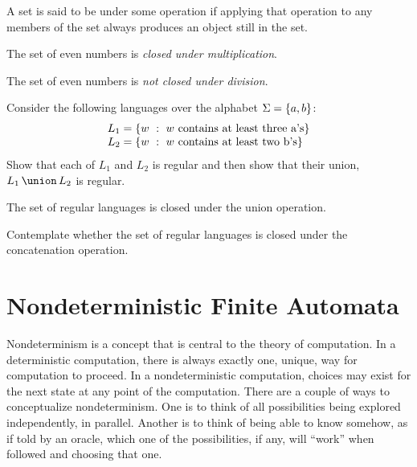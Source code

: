 \documentclass[twoside,letterpaper,openany]{book}
\begin{document}
\begin{defn}[Closure]
A set is said to be  under some operation if applying that operation to any members of the set always produces an object still in the set.
\end{defn}

\begin{thm}
The set of even numbers is \emph{closed under multiplication}.
\end{thm}

\begin{thm}
The set of even numbers is \emph{not closed under division}.
\end{thm}

\begin{exer}
Consider the following languages over the alphabet $\Sigma = \left\lbrace a, b \right\rbrace$:
\[\begin{array}{l}
L_1 = \left\lbrace w\ :\ w~\textrm{contains at least three a's} \right\rbrace \\
L_2 = \left\lbrace w\ :\ w~\textrm{contains at least two b's} \right\rbrace
\end{array}\]
Show that each of $L_1$ and $L_2$ is regular and then show that their union, $\setunion{L_1}{L_2}$ is regular.
\end{exer}

\begin{thm}
The set of regular languages is closed under the union operation.
\end{thm}

\begin{exer}
Contemplate whether the set of regular languages is closed under the concatenation operation.
\end{exer}



\clearpage 

\section{Nondeterministic Finite Automata}

\begin{discussion}
Nondeterminism is a concept that is central to the theory of computation. In a deterministic computation, there is always exactly one, unique, way for computation to proceed. In a nondeterministic computation, choices may exist for the next state at any point of the computation. There are a couple of ways to conceptualize nondeterminism. One is to think of all possibilities being explored independently, in parallel. Another is to think of being able to know somehow, as if told by an oracle, which one of the possibilities, if any, will ``work'' when followed and choosing that one.
\end{discussion}
\end{document}
